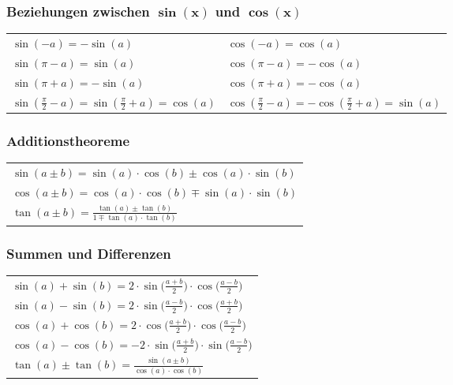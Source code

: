 \subsubsection{Beziehungen zwischen $\bm{\sin(x)}$ und $\bm{\cos(x)}$}

\renewcommand{\arraystretch}{1.3}
\begin{tabular}{ll}
    $\sin(-a) = -\sin(a)$                                           & $\cos(-a) = \cos(a)$                                              \\
    $\sin(\pi - a) = \sin(a)$                                       & $\cos(\pi -a) = - \cos(a)$                                        \\		
    $\sin(\pi + a) = -\sin(a)$                                      & $\cos(\pi + a) = - \cos(a)$                                       \\	
    $\sin(\frac{\pi}{2} - a) = \sin(\frac{\pi}{2} + a) = \cos(a)$   & $\cos(\frac{\pi}{2} - a) = - \cos(\frac{\pi}{2} + a) = \sin(a)$
\end{tabular}


\subsubsection{Additionstheoreme}

\begin{tabular}{l}
    $\sin(a \pm b) = \sin(a) \cdot \cos(b) \pm \cos(a) \cdot \sin(b)$           \\
    $\cos(a \pm b) = \cos(a) \cdot \cos(b) \mp \sin(a) \cdot \sin(b) $          \\
    $\tan(a \pm b) = \frac{\tan(a) \pm \tan(b)}{1 \mp \tan(a) \cdot \tan(b)}$
\end{tabular}


\subsubsection{Summen und Differenzen}

\begin{tabular}{l}
    $\sin(a) + \sin(b) = 2 \cdot \sin \big( \frac{a+b}{2} \big) \cdot \cos \big( \frac{a-b}{2} \big)$   \\
    $\sin(a) - \sin(b) = 2 \cdot \sin \big( \frac{a-b}{2} \big) \cdot \cos \big( \frac{a+b}{2} \big)$   \\
    $\cos(a) + \cos(b) = 2 \cdot \cos \big( \frac{a+b}{2} \big) \cdot \cos \big( \frac{a-b}{2} \big)$   \\
    $\cos(a) - \cos(b) = -2 \cdot \sin \big( \frac{a+b}{2} \big) \cdot \sin \big( \frac{a-b}{2} \big)$  \\
    $\tan(a) \pm \tan(b) = \frac{\sin(a \pm b)}{\cos(a) \cdot \cos(b)}$ 
\end{tabular}


